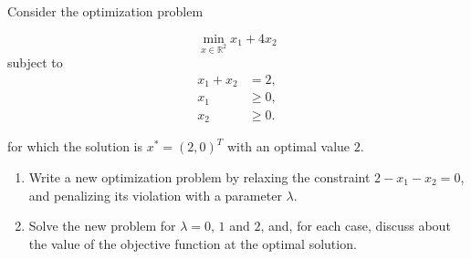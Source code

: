 
Consider the optimization problem

$$\min_{x \in \mathbb{R}^2} x_1+4x_2$$ subject to 
\begin{align*}
x_1+x_2 & = 2,\\
x_1 & \geq 0,\\
x_2 & \geq 0.
\end{align*}

for which the solution is $x^*=(2,0)^T$ with an optimal value $2$.

\begin{enumerate}
\item Write a new optimization problem by relaxing the constraint
  $2-x_1-x_2=0$, and penalizing its violation with a parameter $\lambda$.
\item Solve the new problem for $\lambda
  = 0$, $1$ and $2$, and, for each case, discuss about the value of the
  objective function at the optimal solution. 
\end{enumerate}


